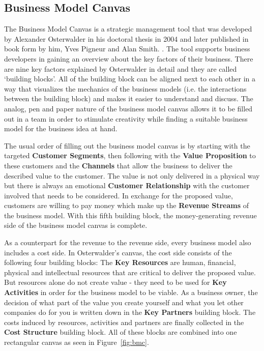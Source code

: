 	\subsection{Business Model Canvas} 
	\label{sec:bmc}
		The Business Model Canvas is a strategic management tool that was developed by Alexander Osterwalder in his doctoral thesis in 2004 and later published in book form by him, Yves Pigneur and Alan Smith. \cite{osterwalder}. The tool supports business developers in gaining an overview about the key factors of their business. There are nine key factors explained by Osterwalder in detail and they are called `building blocks'. All of the building block can be aligned next to each other in a way that visualizes the mechanics of the business models (i.e. the interactions between the building block) and makes it easier to understand and discuss. The analog, pen and paper nature of the business model canvas allows it to be filled out in a team in order to stimulate creativity while finding a suitable business model for the business idea at hand.

		The usual order of filling out the business model canvas \cite[video]{bmc} is by starting with the targeted \textbf{Customer Segments}, then following with the \textbf{Value Proposition} to these customers and the \textbf{Channels} that allow the business to deliver the described value to the customer. The value is not only delivered in a physical way but there is always an emotional \textbf{Customer Relationship} with the customer involved that needs to be considered. In exchange for the proposed value, customers are willing to pay money which make up the \textbf{Revenue Streams} of the business model. With this fifth building block, the money-generating revenue side of the business model canvas is complete.

		As a counterpart for the revenue to the revenue side, every business model also includes a cost side. In Osterwalder's canvas, the cost side consists of the following four building blocks: The \textbf{Key Resources} are human, financial, physical and intellectual resources that are critical to deliver the proposed value. But resources alone do not create value - they need to be used for \textbf{Key Activities} in order for the business model to be viable. As a business owner, the decision of what part of the value you create yourself and what you let other companies do for you is written down in the \textbf{Key Partners} building block. The costs induced by resources, activities and partners are finally collected in the \textbf{Cost Structure} building block. All of these blocks are combined into one rectangular canvas as seen in Figure~\ref{fig:bmc}.

